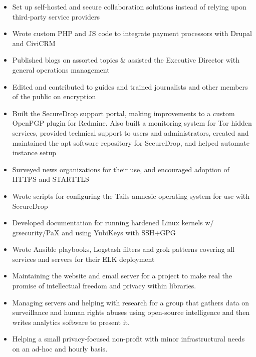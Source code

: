 \documentclass[10pt,a4paper,normalphoto]{altacv}
\begin{document}
\divider

\begin{itemize}
\item Set up self-hosted and secure collaboration solutions instead of relying upon third-party service providers
\item Wrote custom PHP and JS code to integrate payment processors with Drupal and CiviCRM
\item Published blogs on assorted topics \& assisted the Executive Director with general operations management
\item Edited and contributed to guides and trained journalists and other members of the public on encryption
\item Built the SecureDrop support portal, making improvements to a custom OpenPGP plugin for Redmine. Also built a monitoring system for Tor hidden services, provided technical support to users and administrators, created and maintained the apt software repository for SecureDrop, and helped automate instance setup
\item Surveyed news organizations for their use, and encouraged adoption of HTTPS and STARTTLS
\item Wrote scripts for configuring the Tails amnesic operating system for use with SecureDrop
\item Developed documentation for running hardened Linux kernels w/ grsecurity/PaX and using YubiKeys with SSH+GPG
\item Wrote Ansible playbooks, Logstash filters and grok patterns covering all services and servers for their ELK deployment
\end{itemize}


\begin{itemize}
\item Maintaining the website and email server for a project to make real the promise of intellectual freedom and privacy within libraries.
\end{itemize}

\begin{itemize}
\item Managing servers and helping with research for a group that gathers data on surveillance and human rights abuses using open-source intelligence and then writes analytics software to present it.
\end{itemize}

\begin{itemize}
\item Helping a small privacy-focused non-profit with minor infrastructural needs on an ad-hoc and hourly basis.
\end{itemize}

\clearpage
\end{document}
